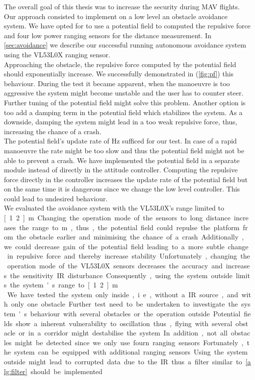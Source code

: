 The overall goal of this thesis was to increase the security during MAV flights. Our approach consisted to implement on a low level an obstacle avoidance system. We have opted for to use a potential field to computed the repulsive force and four low power ranging sensors for the distance measurement. In \cref{sec:avoidance} we describe our successful running autonomous avoidance system using the VL53L0X ranging sensor. \\
Approaching the obstacle, the repulsive force computed by the potential field should exponentially increase. We successfully demonstrated in (\cref{fig:pf}) this behaviour. During the test it became apparent, when the manoeuvre is too aggressive the system might become unstable and the user has to counter steer. Further tuning of the potential field might solve this problem. Another option is too add a damping term in the potential field which stabilizes the system. As a downside, damping the system might lead in a too weak repulsive force, thus, increasing the chance of a crash.\\
The potential field's update rate of \unit[5]{Hz} sufficed for our test. In case of a rapid manoeuvre the rate might be too slow and thus the potential field might not be able to prevent a crash. We have implemented the potential field in a separate module instead of directly in the attitude controller. Computing the repulsive force directly in the controller increases the update rate of the potential field but on the same time it is dangerous since we change the low level controller. This could lead to undesired behaviour. \\
We evaluated the avoidance system with the VL53L0X's range limited to \unit[1.2]{m}. Changing the operation mode of the sensors to long distance increases the range to \unit[2]{m}, thus, the potential field could repulse the platform from the obstacle earlier and minimising the chance of a crash. Additionally, we could decrease gain of the potential field leading to a more subtle change in repulsive force and thereby increase stability. Unfortunately, changing the operation mode of the VL53L0X sensors decreases the accuracy and increases the sensitivity IR disturbance. Consequently, using the system outside limits the system's range to \unit[1.2]{m}.\\
We have tested the system only inside, i.e., without a IR source, and with only one obstacle. Further test need to be undertaken to investigate the system's behaviour with several obstacles or the operation outside. Potential fields show a inherent vulnerability to oscillation thus, flying with several obstacle or in a corridor might destabilise the system. In addition, not all obstacles might be detected since we only use fourn ranging sensors. Fortunately, the system can be equipped with additional ranging sensors. Using the system outside might lead to corrupted data due to the IR thus a filter similar to \cref{alg:filter} should be implemented.\\